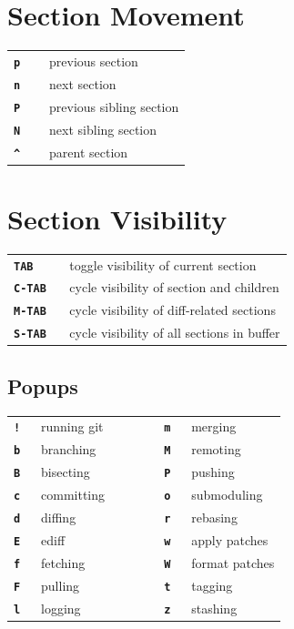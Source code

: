 \documentclass[9pt]{extarticle} %
\begin{document}
\begin{multicols}{3}
  \renewcommand{\arraystretch}{1.1}
  \section*{Section Movement}
  \begin{tabular}{L{0.20\linewidth} L{0.80\linewidth}}
    \tt \textbf{p}  & previous section \\
    \tt \textbf{n}  & next section \\
    \tt \textbf{P}  & previous sibling section \\
    \tt \textbf{N}  & next sibling section \\
    \tt \textbf{\^{}} & parent section
  \end{tabular}


  \section*{Section Visibility}

  \begin{tabular}{L{0.20\linewidth} L{0.80\linewidth}}
    \tt \textbf{TAB} & toggle visibility of current section \\
    \tt \textbf{C-TAB} & cycle visibility of section and children \\
    \tt \textbf{M-TAB} & cycle visibility of diff-related sections \\
    \tt \textbf{S-TAB} & cycle visibility of all sections in buffer
  \end{tabular}

  \columnbreak{}

  \begin{mdframed}
    \section*{Popups}

    \begin{tabular}{L{0.1\linewidth} L{0.3\linewidth} C{0.15\linewidth}
      L{0.1\linewidth} L{0.35\linewidth}}
      \tt \textbf{!} & running git & & \tt \textbf{m} & merging \\
      \tt \textbf{b} & branching & & \tt \textbf{M} & remoting \\
      \tt \textbf{B} & bisecting & & \tt \textbf{P} & pushing \\
      \tt \textbf{c} & committing & & \tt \textbf{o} & submoduling \\
      \tt \textbf{d} & diffing & & \tt \textbf{r} & rebasing \\
      \tt \textbf{E} & ediff & & \tt \textbf{w} & apply patches \\
      \tt \textbf{f} & fetching & & \tt \textbf{W} & format patches \\
      \tt \textbf{F} & pulling & & \tt \textbf{t} & tagging \\
      \tt \textbf{l} & logging & & \tt \textbf{z} & stashing
    \end{tabular}
  \end{mdframed}


\end{multicols}
\end{document}
